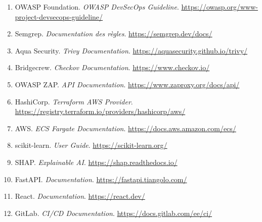 \documentclass[12pt,a4paper]{report}
\begin{document}
\begin{enumerate}
    \item OWASP Foundation. \textit{OWASP DevSecOps Guideline}. \url{https://owasp.org/www-project-devsecops-guideline/}
    \item Semgrep. \textit{Documentation des règles}. \url{https://semgrep.dev/docs/}
    \item Aqua Security. \textit{Trivy Documentation}. \url{https://aquasecurity.github.io/trivy/}
    \item Bridgecrew. \textit{Checkov Documentation}. \url{https://www.checkov.io/}
    \item OWASP ZAP. \textit{API Documentation}. \url{https://www.zaproxy.org/docs/api/}
    \item HashiCorp. \textit{Terraform AWS Provider}. \url{https://registry.terraform.io/providers/hashicorp/aws/}
    \item AWS. \textit{ECS Fargate Documentation}. \url{https://docs.aws.amazon.com/ecs/}
    \item scikit-learn. \textit{User Guide}. \url{https://scikit-learn.org/}
    \item SHAP. \textit{Explainable AI}. \url{https://shap.readthedocs.io/}
    \item FastAPI. \textit{Documentation}. \url{https://fastapi.tiangolo.com/}
    \item React. \textit{Documentation}. \url{https://react.dev/}
    \item GitLab. \textit{CI/CD Documentation}. \url{https://docs.gitlab.com/ee/ci/}
\end{enumerate}
\end{document}

